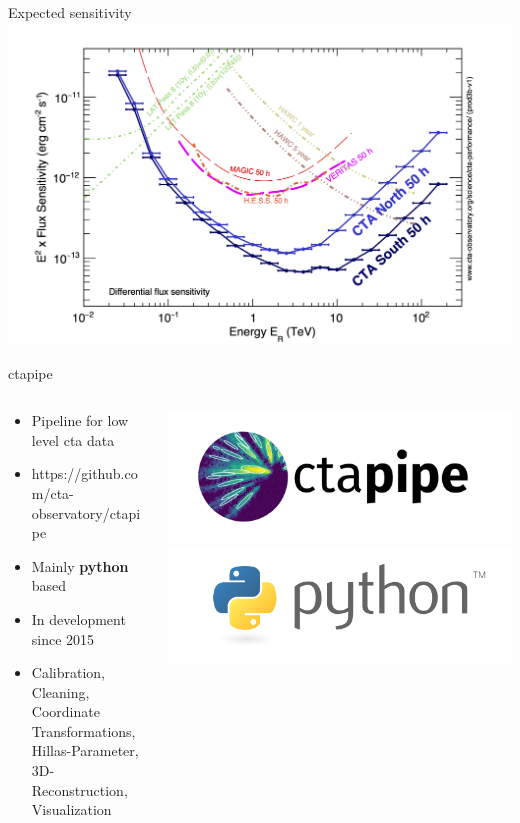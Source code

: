 \begin{frame}{Expected sensitivity \cite{cta_sensitivity}}
\centering
        \includegraphics[width=0.75\linewidth]{images/cta_sensitivity.png}
\end{frame}

\begin{frame}{ctapipe}
    \begin{columns}[T] %
        \begin{column}{.45\textwidth}
            \vspace{10pt}
            \begin{itemize}
                \item { Pipeline for low level cta data}
                \item { https://github.com/cta-observatory/ctapipe}
                \item { Mainly \textbf{python} based}
                \item { In development since 2015}
                \item { Calibration, Cleaning, Coordinate Transformations, 
                        Hillas-Parameter, 3D-Reconstruction, Visualization}
            \end{itemize}
        \end{column}
        \begin{column}{.48\textwidth}
            \includegraphics[width=\linewidth]{images/ctapipe_logo.png}
            \includegraphics[width=\linewidth]{images/python_logo.png}
        \end{column}
    \end{columns}
\end{frame}
